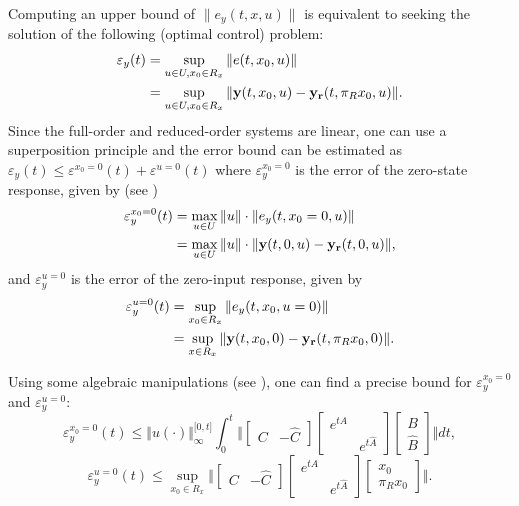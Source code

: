 Computing an upper bound of $\| e_y (t,x,u) \|$ is equivalent to seeking 
the solution of the following (optimal control) problem:
\[\begin{aligned} \varepsilon_y(t)&=\sup_{u\in U, x_0\in R_x}\|e(t,x_0,u)\| \\ &=
\sup_{u\in U, x_0\in R_x}\|{\bf y}(t,x_0,u)-{\bf y_r}(t,\pi_Rx_0,u)\|. \end{aligned}\]
%
Since the full-order and reduced-order systems are linear, one can use a superposition
principle and the error bound can be 
estimated as~$\varepsilon_y(t)\leq \varepsilon^{x_0=0}(t)+\varepsilon^{u=0}(t)$
where $\varepsilon_y^{x_0=0}$ is the error of the zero-state response, given
by (see \cite{Han-Krogh04})
\[
\begin{aligned} \varepsilon_y^{x_0=0}(t)&=\max_{u\in U}\|u\| \cdot \|e_y(t,x_0=0,u)\| \\ &=\max_{u\in U}\|u\| \cdot \|{\bf y}(t,0,u)-{\bf y_r}(t,0,u)\|,
\end{aligned}
\]
and $\varepsilon_y^{u=0}$ is the error of the zero-input response, given by
\[\begin{aligned}\varepsilon_y^{u=0}(t)&=\sup_{x_0\in R_x}\|e_y(t,x_0,u=0)\| \\ &=\sup_{x\in R_x}\| {\bf y}(t,x_0,0)-{\bf y_r}(t,\pi_Rx_0,0)\|.\end{aligned}\]

Using some algebraic manipulations (see \cite{Han-Krogh04}),
one can find a precise bound for $\varepsilon_y^{x_0=0}$
and $\varepsilon_y^{u=0}$:
{\small
\begin{equation}
\displaystyle{ 
\varepsilon_y^{x_0 = 0}(t) \leq \Vert u( \cdot ) \Vert_\infty^{\lbrack 0 , t \rbrack } \int_0^t  \Vert 
\left\lbrack
\begin{array}{cc}
C & -\hat C
\end{array}
\right\rbrack
\left\lbrack \begin{array}{cc}
e^{tA} & \\ & e^{t \hat A}
\end{array}
\right\rbrack
\left\lbrack \begin{array}{c}
B \\ \hat B
\end{array}
\right\rbrack \Vert dt ,
}
\label{eps_y_x}
\end{equation}
}
%
{\small
\begin{equation} 
\varepsilon_y^{u = 0}(t) \leq \sup_{x_0 \in R_x}  \Vert 
\left\lbrack
\begin{array}{cc}
C & -\hat C
\end{array}
\right\rbrack
\left\lbrack \begin{array}{cc}
e^{tA} & \\ & e^{t \hat A}
\end{array}
\right\rbrack
\left\lbrack \begin{array}{c}
x_0 \\ \pi_R x_0
\end{array}
\right\rbrack \Vert.
\label{eps_y_u}
\end{equation}
}

